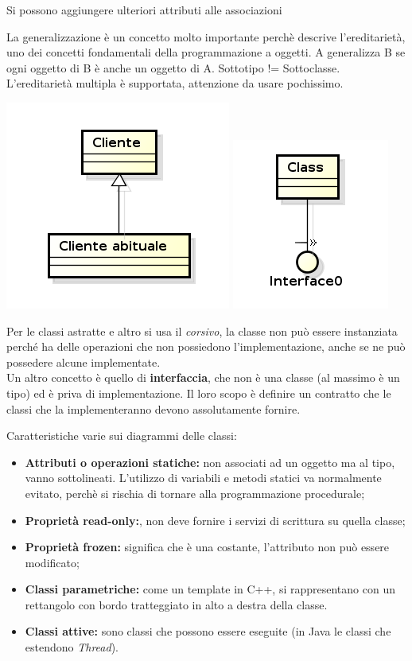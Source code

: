 Si possono aggiungere ulteriori attributi alle associazioni

La generalizzazione è un concetto molto importante perchè descrive l'ereditarietà, uno dei concetti fondamentali della programmazione a oggetti. A generalizza B se ogni oggetto di B è anche un oggetto di A. Sottotipo != Sottoclasse. L'ereditarietà multipla è supportata, attenzione da usare pochissimo.

\includegraphics[width=0.3\columnwidth]{img15} 
\includegraphics[width=0.3\columnwidth]{img16} %

Per le classi astratte e altro si usa il \textit{corsivo}, la classe non può essere instanziata perché ha delle operazioni che non possiedono l'implementazione, anche se ne può possedere alcune implementate.\\

Un altro concetto è quello di \textbf{interfaccia}, che non è una classe (al massimo è un tipo) ed è priva di implementazione. Il loro scopo è definire un contratto che le classi che la implementeranno devono assolutamente fornire.

Caratteristiche varie sui diagrammi delle classi:
\begin{itemize}
	\item \textbf{Attributi o operazioni statiche:} non associati ad un oggetto ma al tipo, vanno sottolineati. L'utilizzo di variabili e metodi statici va normalmente evitato, perchè si rischia di tornare alla programmazione procedurale;
	\item \textbf{Proprietà read-only:}, non deve fornire i servizi di scrittura su quella classe;
	\item \textbf{Proprietà frozen:} significa che è una costante, l'attributo non può essere modificato;
	\item \textbf{Classi parametriche:} come un template in C++, si rappresentano con un rettangolo con bordo tratteggiato in alto a destra della classe. 
	\item \textbf{Classi attive:} sono classi che possono essere eseguite (in Java le classi che estendono \textit{Thread}).
 
\end{itemize}

